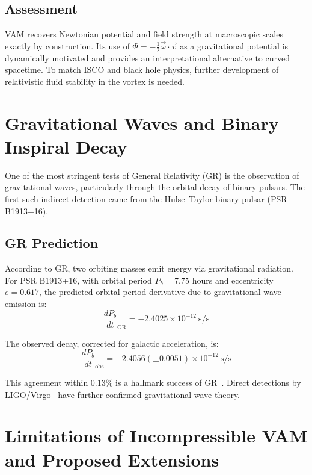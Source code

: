 \documentclass[a4paper, aps,preprint,superscriptaddress, 12pt]{revtex4}
\begin{document}
\subsection{Assessment}
VAM recovers Newtonian potential and field strength at macroscopic scales exactly by construction. Its use of $\Phi = -\tfrac{1}{2}\vec{\omega}\cdot\vec{v}$ as a gravitational potential is dynamically motivated and provides an interpretational alternative to curved spacetime. To match ISCO and black hole physics, further development of relativistic fluid stability in the vortex is needed.


\section{Gravitational Waves and Binary Inspiral Decay}

One of the most stringent tests of General Relativity (GR) is the observation of gravitational waves, particularly through the orbital decay of binary pulsars. The first such indirect detection came from the Hulse--Taylor binary pulsar (PSR B1913+16).

\subsection*{GR Prediction}

According to GR, two orbiting masses emit energy via gravitational radiation. For PSR B1913+16, with orbital period $P_b = 7.75$ hours and eccentricity $e = 0.617$, the predicted orbital period derivative due to gravitational wave emission is:
\begin{equation}
\frac{dP_b}{dt}_\text{GR} = -2.4025\times10^{-12} \ \text{s/s}
\end{equation}

The observed decay, corrected for galactic acceleration, is:
\begin{equation}
\frac{dP_b}{dt}_\text{obs} = -2.4056(\pm 0.0051)\times10^{-12} \ \text{s/s}
\end{equation}

This agreement within 0.13\% is a hallmark success of GR~\cite{weisberg2016}. Direct detections by LIGO/Virgo~\cite{abbott2016} have further confirmed gravitational wave theory.

\section{Limitations of Incompressible VAM and Proposed Extensions}
\end{document}
